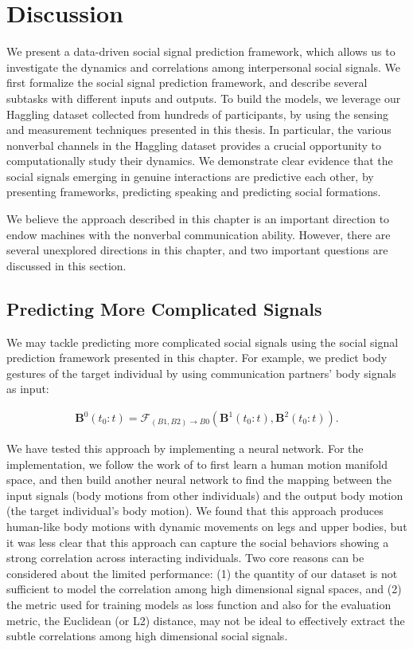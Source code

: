 
\section{Discussion}

We present a data-driven social signal prediction framework, which allows us to investigate the dynamics and correlations among interpersonal social signals. We first formalize the social signal prediction framework, and describe several subtasks with different inputs and outputs. To build the models, we leverage our Haggling dataset collected from hundreds of participants, by using the sensing and measurement techniques presented in this thesis. In particular, the various nonverbal channels in the Haggling dataset provides a crucial opportunity to computationally study their dynamics. We demonstrate clear evidence that the social signals emerging in genuine interactions are predictive each other, by presenting frameworks, predicting speaking and predicting social formations.

We believe the approach described in this chapter is an important direction to endow machines with the nonverbal communication ability. However, there are several unexplored directions in this chapter, and two important questions are discussed in this section. 

\subsection{Predicting More Complicated Signals}
We may tackle predicting more complicated social signals using the social signal prediction framework presented in this chapter. For example, we predict body gestures of the target individual by using communication partners' body signals as input:

\begin{gather}	
\mathbf{B}^0 (t_0:t) = \mathcal{F}_{(B1,B2)\rightarrow B0} \left( \mathbf{B}^1 (t_0:t), \mathbf{B}^2 (t_0:t) \right) .
\end{gather}

We have tested this approach by implementing a neural network. For the implementation, we follow the work of \cite{holden2016deep} to first learn a human motion manifold space, and then build another neural network to find the mapping between the input signals (body motions from other individuals) and the output body motion (the target individual's body motion). We found that this approach produces human-like body motions with dynamic movements on legs and upper bodies, but it was less clear that this approach can capture the social behaviors showing a strong correlation across interacting individuals. Two core reasons can be considered about the limited performance: (1) the quantity of our dataset is not sufficient to model the correlation among high dimensional signal spaces, and (2) the metric used for training models as loss function and also for the evaluation metric, the Euclidean (or L2) distance, may not be ideal to effectively extract the subtle correlations among high dimensional social signals.

